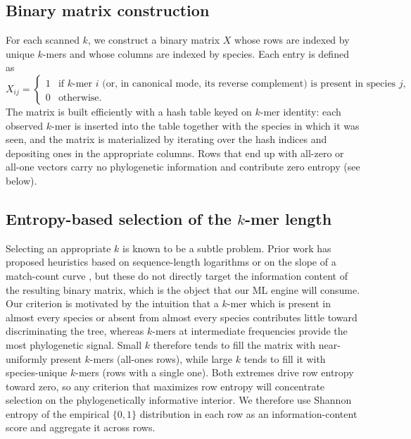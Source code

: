 \documentclass[11pt]{article}
\begin{document}
\subsection{Binary matrix construction}

For each scanned $k$, we construct a binary matrix $X$ whose rows are indexed
by unique $k$-mers and whose columns are indexed by species. Each entry is
defined as
\begin{equation*}
X_{ij} =
\begin{cases}
1 & \text{if $k$-mer $i$ (or, in canonical mode, its reverse complement) is present in species $j$,} \\
0 & \text{otherwise.}
\end{cases}
\end{equation*}
The matrix is built efficiently with a hash table keyed on $k$-mer identity:
each observed $k$-mer is inserted into the table together with the species in
which it was seen, and the matrix is materialized by iterating over the hash
indices and depositing ones in the appropriate columns. Rows that end up
with all-zero or all-one vectors carry no phylogenetic information and
contribute zero entropy (see below).

\subsection{Entropy-based selection of the $k$-mer length}

Selecting an appropriate $k$ is known to be a subtle problem. Prior work has
proposed heuristics based on sequence-length logarithms or on the slope of
a match-count curve \citep{rohling2020slopespam}, but these do not directly
target the information content of the resulting binary matrix, which is the
object that our ML engine will consume. Our criterion is motivated by the
intuition that a $k$-mer which is present in almost every species or absent
from almost every species contributes little toward discriminating the tree,
whereas $k$-mers at intermediate frequencies provide the most phylogenetic
signal. Small $k$ therefore tends to fill the matrix with near-uniformly
present $k$-mers (all-ones rows), while large $k$ tends to fill it with
species-unique $k$-mers (rows with a single one). Both extremes drive row
entropy toward zero, so any criterion that maximizes row entropy will
concentrate selection on the phylogenetically informative interior. We
therefore use Shannon entropy \citep{shannon1948mathematical} of the
empirical $\{0, 1\}$ distribution in each row as an information-content
score and aggregate it across rows.
\end{document}
